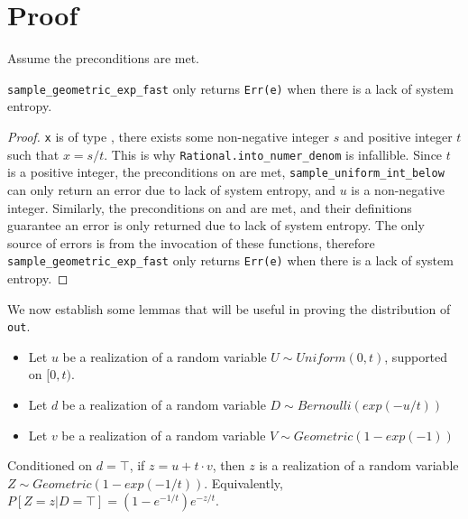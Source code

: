 \documentclass{article}
\begin{document}
\section{Proof}
Assume the preconditions are met.

\begin{lemma}\label{err-e}
    \texttt{sample\_geometric\_exp\_fast} only returns \texttt{Err(e)} when there is a lack of system entropy.
\end{lemma}

\begin{proof}
    \texttt{x} is of type , there exists some non-negative integer $s$ and positive integer $t$ such that $x = s/t$.
    This is why \texttt{Rational.into\_numer\_denom} is infallible.
    Since $t$ is a positive integer, the preconditions on  are met, 
    \texttt{sample\_uniform\_int\_below} can only return an error due to lack of system entropy, and $u$ is a non-negative integer.
    Similarly, the preconditions on  and  are met,
    and their definitions guarantee an error is only returned due to lack of system entropy.
    The only source of errors is from the invocation of these functions,
    therefore \texttt{sample\_geometric\_exp\_fast} only returns \texttt{Err(e)} when there is a lack of system entropy.
\end{proof}

We now establish some lemmas that will be useful in proving the distribution of \texttt{out}.

\begin{itemize}
    \item Let $u$ be a realization of a random variable $U \sim Uniform(0, t)$, supported on $[0, t)$.
    \item Let $d$ be a realization of a random variable $D \sim Bernoulli(exp(-u/t))$
    \item Let $v$ be a realization of a random variable $V \sim Geometric(1 - exp(-1))$
\end{itemize}

\begin{lemma}\label{geom_1_t}\cite{CKS20}
    Conditioned on $d = \top$, if $z = u + t \cdot v$, 
    then $z$ is a realization of a random variable $Z \sim Geometric(1 - exp(-1/t))$. 
    Equivalently, $P[Z=z | D=\top] = (1 - e^{-1/t}) e^{-z/t}$.
\end{lemma}
\end{document}
